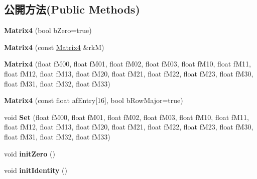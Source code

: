 \subsection*{公開方法(Public Methods)}
\begin{DoxyCompactItemize}
\item 
{\bfseries Matrix4} (bool b\+Zero=true)\hypertarget{class_magnum_1_1_matrix4_a758e71e11639ef13818caead34b5900e}{}\label{class_magnum_1_1_matrix4_a758e71e11639ef13818caead34b5900e}

\item 
{\bfseries Matrix4} (const \hyperlink{class_magnum_1_1_matrix4}{Matrix4} \&rkM)\hypertarget{class_magnum_1_1_matrix4_a683597bd69debd5661fbf58f9c302396}{}\label{class_magnum_1_1_matrix4_a683597bd69debd5661fbf58f9c302396}

\item 
{\bfseries Matrix4} (float f\+M00, float f\+M01, float f\+M02, float f\+M03, float f\+M10, float f\+M11, float f\+M12, float f\+M13, float f\+M20, float f\+M21, float f\+M22, float f\+M23, float f\+M30, float f\+M31, float f\+M32, float f\+M33)\hypertarget{class_magnum_1_1_matrix4_a0e89c088261cbe866cdb0037e8f35b40}{}\label{class_magnum_1_1_matrix4_a0e89c088261cbe866cdb0037e8f35b40}

\item 
{\bfseries Matrix4} (const float af\+Entry\mbox{[}16\mbox{]}, bool b\+Row\+Major=true)\hypertarget{class_magnum_1_1_matrix4_a197ec84f2795c21b7e2a518b9cb52324}{}\label{class_magnum_1_1_matrix4_a197ec84f2795c21b7e2a518b9cb52324}

\item 
void {\bfseries Set} (float f\+M00, float f\+M01, float f\+M02, float f\+M03, float f\+M10, float f\+M11, float f\+M12, float f\+M13, float f\+M20, float f\+M21, float f\+M22, float f\+M23, float f\+M30, float f\+M31, float f\+M32, float f\+M33)\hypertarget{class_magnum_1_1_matrix4_a3d2d1deed5482507a82f2ab29ad17127}{}\label{class_magnum_1_1_matrix4_a3d2d1deed5482507a82f2ab29ad17127}

\item 
void {\bfseries init\+Zero} ()\hypertarget{class_magnum_1_1_matrix4_a9c2ab42da4629ad979319e7e76be36c1}{}\label{class_magnum_1_1_matrix4_a9c2ab42da4629ad979319e7e76be36c1}

\item 
void {\bfseries init\+Identity} ()\hypertarget{class_magnum_1_1_matrix4_a507568577193f5f6ffc02cfffce34f5a}{}\label{class_magnum_1_1_matrix4_a507568577193f5f6ffc02cfffce34f5a}


\end{DoxyCompactItemize}

